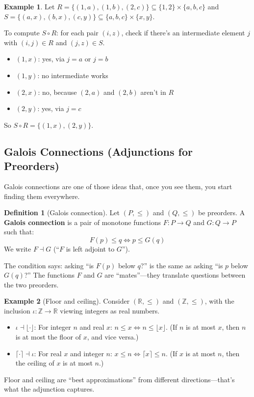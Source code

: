 \documentclass[11pt]{article}
\newcommand{\Z}{\mathbb{Z}}
\newcommand{\R}{\mathbb{R}}
\theoremstyle{definition}
\newtheorem{definition}{Definition}[section]
\newtheorem{example}{Example}[section]
\theoremstyle{plain}
\theoremstyle{remark}
\begin{document}
\begin{example}
Let $R = \{(1, a), (1, b), (2, c)\} \subseteq \{1, 2\} \times \{a, b, c\}$ and $S = \{(a, x), (b, x), (c, y)\} \subseteq \{a, b, c\} \times \{x, y\}$.

To compute $S \circ R$: for each pair $(i, z)$, check if there's an intermediate element $j$ with $(i, j) \in R$ and $(j, z) \in S$.
\begin{itemize}
  \item $(1, x)$: yes, via $j = a$ or $j = b$
  \item $(1, y)$: no intermediate works
  \item $(2, x)$: no, because $(2, a)$ and $(2, b)$ aren't in $R$
  \item $(2, y)$: yes, via $j = c$
\end{itemize}
So $S \circ R = \{(1, x), (2, y)\}$.
\end{example}

\subsection{Galois Connections (Adjunctions for Preorders)}

Galois connections are one of those ideas that, once you see them, you start finding them everywhere.

\begin{definition}[Galois connection]
Let $(P, \leq)$ and $(Q, \leq)$ be preorders. A \textbf{Galois connection} is a pair of monotone functions $F: P \to Q$ and $G: Q \to P$ such that:
\[
F(p) \leq q \iff p \leq G(q)
\]
We write $F \dashv G$ (``$F$ is left adjoint to $G$'').
\end{definition}

The condition says: asking ``is $F(p)$ below $q$?'' is the same as asking ``is $p$ below $G(q)$?'' The functions $F$ and $G$ are ``mates''---they translate questions between the two preorders.

\begin{example}[Floor and ceiling]
Consider $(\R, \leq)$ and $(\Z, \leq)$, with the inclusion $\iota: \Z \to \R$ viewing integers as real numbers.
\begin{itemize}
  \item $\iota \dashv \lfloor \cdot \rfloor$: For integer $n$ and real $x$: $n \leq x \iff n \leq \lfloor x \rfloor$. (If $n$ is at most $x$, then $n$ is at most the floor of $x$, and vice versa.)
  \item $\lceil \cdot \rceil \dashv \iota$: For real $x$ and integer $n$: $x \leq n \iff \lceil x \rceil \leq n$. (If $x$ is at most $n$, then the ceiling of $x$ is at most $n$.)
\end{itemize}
Floor and ceiling are ``best approximations'' from different directions---that's what the adjunction captures.
\end{example}
\end{document}
